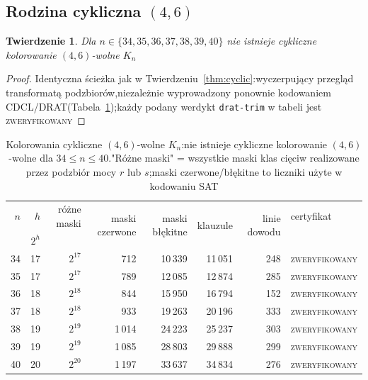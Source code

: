 \documentclass[11pt]{article}
\newtheorem{theorem}{Twierdzenie}
\theoremstyle{definition}
\theoremstyle{plain}
\newcommand{\K}{\ensuremath{K}}
\begin{document}
\subsection{Rodzina cykliczna $(4,6)$}\label{sec:res46}

\begin{theorem}\label{thm:cyclic46}
Dla $n \in \{34,35,36,37,38,39,40\}$ nie istnieje cykliczne kolorowanie $(4,6)$-wolne $\K_n$\end{theorem}

\begin{proof}
Identyczna ścieżka jak w Twierdzeniu~\ref{thm:cyclic}:wyczerpujący przegląd transformatą podzbiorów,niezależnie wyprowadzony ponownie kodowaniem CDCL/DRAT(Tabela~\ref{tab:cyclic46});każdy podany werdykt \texttt{drat-trim} w tabeli jest \textsc{zweryfikowany}\end{proof}

\begin{table}[ht]\centering\small
\begin{tabular}{rrrrrrrl}
\toprule
$n$ & $h$ & różne maski & \multirow{2}{*}{maski czerwone} & \multirow{2}{*}{maski błękitne} & \multirow{2}{*}{klauzule} & \multirow{2}{*}{linie dowodu} & certyfikat \\
 & $2^h$ & & & DRAT \\
\midrule
34 & 17 & $2^{17}$ & 712 & 10\,339 &11\,051 &248 &\textsc{zweryfikowany} \\
35 & 17 & $2^{17}$ & 789 &12\,085 &12\,874 &285 &\textsc{zweryfikowany} \\
36 & 18 & $2^{18}$ & 844 &15\,950 &16\,794 &152 &\textsc{zweryfikowany} \\
37 & 18 & $2^{18}$ & 933 &19\,263 &20\,196 &333 &\textsc{zweryfikowany} \\
38 & 19 & $2^{19}$ & 1\,014 &24\,223 &25\,237 &303 &\textsc{zweryfikowany} \\
39 &  19 & $2^{19}$ & 1\,085 &28\,803 &29\,888 &299 &\textsc{zweryfikowany} \\
40 & 20 & $2^{20}$ & 1\,197 &33\,637 &34\,834 &276 &\textsc{zweryfikowany} \\
\bottomrule
\end{tabular}
\caption{Kolorowania cykliczne $(4,6)$-wolne $\K_n$:nie istnieje cykliczne kolorowanie $(4,6)$-wolne dla $34 \le n \le 40$."Różne maski" = wszystkie maski klas cięciw realizowane przez podzbiór mocy $r$ lub $s$;maski czerwone/błękitne to liczniki użyte w kodowaniu SAT}\label{tab:cyclic46}
\end{table}
\end{document}
